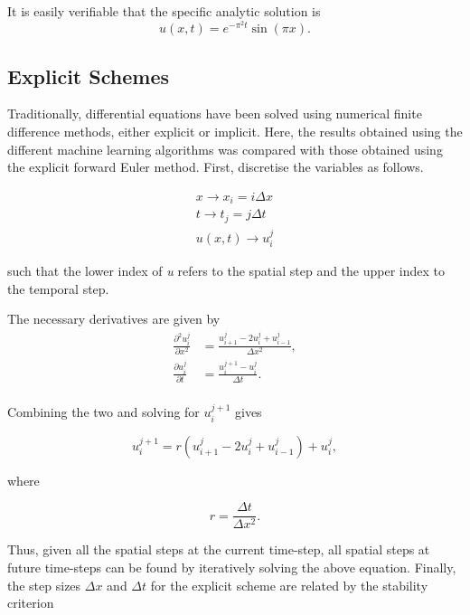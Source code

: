 \documentclass[multicolumn, 9pt]{extarticle}
\begin{document}
It is easily verifiable that the specific analytic solution is
\begin{equation}\label{eq:anal}
	u(x, t) = e^{-\pi^2t}\sin(\pi x).
\end{equation}

\subsection{Explicit Schemes}
Traditionally, differential equations have been solved using numerical finite difference methods, either explicit or implicit. Here, the results obtained using the different machine learning algorithms was compared with those obtained using the explicit forward Euler method. First, discretise the variables as follows.

\begin{align*}
	x \rightarrow x_{i} = i\Delta x  \\
	t \rightarrow t_{j} = j \Delta t \\
	u(x, t)  \rightarrow u_{i}^{j}
\end{align*}

such that the lower index of \textit{u} refers to the spatial step and the upper index to the temporal step.

The necessary derivatives are given by
\begin{align*}
	\frac{\partial^2u_i^j}{\partial x^2} & = \frac{u_{i+1}^{j} - 2u_{i}^{j} + u_{i-1}^{j}}{\Delta x^{2}}, \\
	\frac{\partial u_i^j}{\partial t}    & = \frac{u_{i}^{j+1} - u_{i}^{j}}{\Delta t}.                    \\
\end{align*}

Combining the two and solving for $u_{i}^{j+1}$ gives

\begin{equation}\label{eq:euler}
	u_{i}^{j+1} = r(u_{i+1}^{j} - 2u_{i}^{j} + u_{i-1}^{j}) + u_{i}^{j},
\end{equation}

where

\begin{equation*}
	r = \frac{\Delta t}{\Delta x^{2}}.
\end{equation*}

Thus, given all the spatial steps at the current time-step, all spatial steps at future time-steps can be found by iteratively solving the above equation. Finally, the step sizes $\Delta x$ and $\Delta t$ for the explicit scheme are related by the stability criterion
\end{document}
